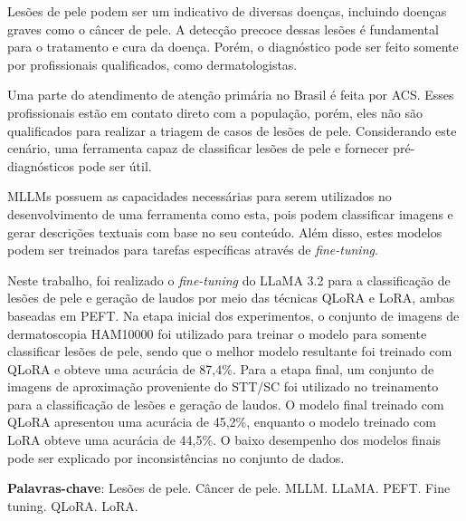 \imprimircapa

\imprimirfolhaderosto*

\begin{fichacatalografica}
	
\end{fichacatalografica}





\setlength{\absparsep}{18pt}
\begin{resumo}
	\SingleSpacing
	Lesões de pele podem ser um indicativo de diversas doenças, incluindo doenças graves como o câncer de pele. A detecção precoce dessas lesões é fundamental para o
	tratamento e cura da doença. Porém, o diagnóstico pode ser feito somente por profissionais qualificados, como dermatologistas.

	Uma parte do atendimento de atenção primária no Brasil é feita por \ac{ACS}. Esses profissionais estão em contato direto com a população, porém, eles não são
	qualificados para realizar a triagem de casos de lesões de pele. Considerando este cenário, uma ferramenta capaz de classificar lesões de pele e fornecer
	pré-diagnósticos pode ser útil.

	\acp{MLLM} possuem as capacidades necessárias para serem utilizados no desenvolvimento de uma ferramenta como esta, pois podem classificar imagens e gerar descrições
	textuais com base no seu conteúdo. Além disso, estes modelos podem ser treinados para tarefas específicas através de \textit{fine-tuning}.


	Neste trabalho, foi realizado o \textit{fine-tuning} do \ac{LLaMA} 3.2 para a classificação de lesões de pele e geração de laudos por meio das técnicas \ac{QLoRA} e
	\ac{LoRA}, ambas baseadas em \ac{PEFT}. Na etapa inicial dos experimentos, o conjunto de imagens de dermatoscopia \ac{HAM10000} foi utilizado para treinar o modelo
	para somente classificar lesões de pele, sendo que o melhor modelo resultante foi treinado com \ac{QLoRA} e obteve uma acurácia de 87,4\%. Para a etapa final,
	um conjunto de imagens de aproximação proveniente do \ac{STT/SC} foi utilizado no treinamento para a classificação de lesões e geração de laudos. O modelo final
	treinado com \ac{QLoRA} apresentou uma acurácia de 45,2\%, enquanto o modelo treinado com \ac{LoRA} obteve uma acurácia de 44,5\%. O baixo desempenho dos modelos finais
	pode ser explicado por inconsistências no conjunto de dados.

	\textbf{Palavras-chave}: Lesões de pele. Câncer de pele. MLLM. LLaMA. PEFT. Fine tuning. QLoRA. LoRA.
\end{resumo}

